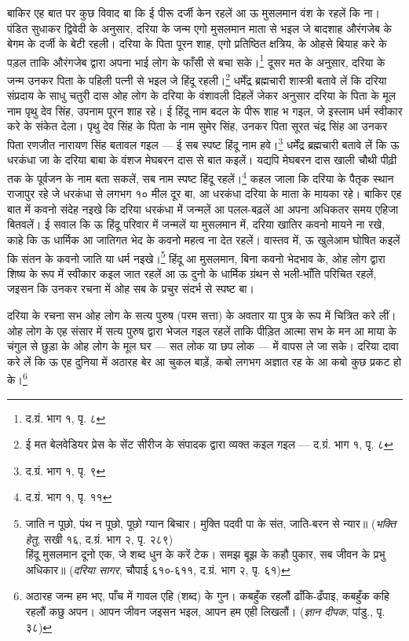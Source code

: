 बाकिर एह बात पर कुछ विवाद बा कि ई पीरू दर्जी केन रहलें आ ऊ मुसलमान वंश के रहलें कि ना। पंडित सुधाकर द्विवेदी के अनुसार, दरिया के जन्म एगो मुसलमान माता से भइल जे बादशाह औरंगजेब के बेगम के दर्जी के बेटी रहली। दरिया के पिता पूरन शाह, एगो प्रतिष्ठित क्षत्रिय, के ओहसे बियाह करे के पड़ल ताकि औरंगजेब द्वारा अपना भाई लोग के फाँसी से बचा सके।\footnote{द.ग्रं. भाग १, पृ. ८} दूसर मत के अनुसार, दरिया के जन्म उनकर पिता के पहिली पत्नी से भइल जे हिंदू रहली।\footnote{ई मत बेलवेडियर प्रेस के सेंट सीरीज के संपादक द्वारा व्यक्त कइल गइल — द.ग्रं. भाग १, पृ. ८} धर्मेंद्र ब्रह्मचारी शास्त्री बतावे लें कि दरिया संप्रदाय के साधु चतुरी दास ओह लोग के दरिया के वंशावली दिहलें जेकर अनुसार दरिया के पिता के मूल नाम पृथु देव सिंह, उपनाम पूरन शाह रहे। ई हिंदू नाम बदल के पीरू शाह भ गइल, जे इस्लाम धर्म स्वीकार करे के संकेत देला। पृथु देव सिंह के पिता के नाम सुमेर सिंह, उनकर पिता सूरत चंद्र सिंह आ उनकर पिता रणजीत नारायण सिंह बतावल गइल — ई सब स्पष्ट हिंदू नाम हवे।\footnote{द.ग्रं. भाग १, पृ. ९} धर्मेंद्र ब्रह्मचारी बतावे लें कि ऊ धरकंधा जा के दरिया बाबा के वंशज मेघबरन दास से बात कइलें। यद्यपि मेघबरन दास खाली चौथी पीढ़ी तक के पूर्वजन के नाम बता सकलें, सब नाम स्पष्ट हिंदू रहलें।\footnote{द.ग्रं. भाग १, पृ. ११} कहल जाला कि दरिया के पैतृक स्थान राजापुर रहे जे धरकंधा से लगभग १० मील दूर बा, आ धरकंधा दरिया के माता के मायका रहे। बाकिर एह बात में कवनो संदेह नइखे कि दरिया धरकंधा में जन्मलें आ पलल-बढ़लें आ अपना अधिकतर समय एहिजा बितवलें। ई सवाल कि ऊ हिंदू परिवार में जन्मलें या मुसलमान में, दरिया खातिर कवनो मायने ना रखे, काहे कि ऊ धार्मिक आ जातिगत भेद के कवनो महत्व ना देत रहलें। वास्तव में, ऊ खुलेआम घोषित कइलें कि संतन के कवनो जाति या धर्म नइखे।\footnote{जाति न पूछो, पंथ न पूछो, पूछो ग्यान बिचार। मुक्ति पदवी पा के संत, जाति-बरन से न्यार॥ (\textit{भक्ति हेतु}, सखी १६, द.ग्रं. भाग २, पृ. २८९) \\ हिंदू मुसलमान दूनो एक, जे शब्द धुन के करें टेक। समझ बूझ के कहौ पुकार, सब जीवन के प्रभु अधिकार॥ (\textit{दरिया सागर}, चौपाई ६१०-६११, द.ग्रं. भाग २, पृ. ६१)} हिंदू आ मुसलमान, बिना कवनो भेदभाव के, ओह लोग द्वारा शिष्य के रूप में स्वीकार कइल जात रहलें आ ऊ दुनो के धार्मिक ग्रंथन से भली-भाँति परिचित रहलें, जइसन कि उनकर रचना में ओह सब के प्रचुर संदर्भ से स्पष्ट बा।

दरिया के रचना सभ ओह लोग के सत्य पुरुष (परम सत्ता) के अवतार या पुत्र के रूप में चित्रित करे लीं। ओह लोग के एह संसार में सत्य पुरुष द्वारा भेजल गइल रहलें ताकि पीड़ित आत्मा सभ के मन आ माया के चंगुल से छुड़ा के ओह लोग के मूल घर — सत लोक या छप लोक — में वापस ले जा सके। दरिया दावा करे लें कि ऊ एह दुनिया में अठारह बेर आ चुकल बाड़ें, कबो लगभग अज्ञात रह के आ कबो कुछ प्रकट हो के।\footnote{अठारह जन्म हम भए, पाँच में गावल एहि (शब्द) के गुन। कबहुँक रहलौं ढाँकि-ढँपाइ, कबहुँक कहि रहलौं कछु अपन। आपन जीवन जइसन भइल, आपन हम एही लिखलौं। (\textit{ज्ञान दीपक}, पांडु., पृ. ३८)}

